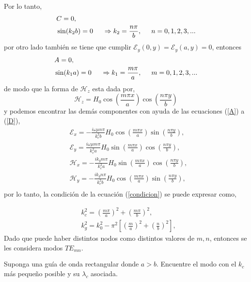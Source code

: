 \documentclass[11pt,fleqn]{book} %
\begin{document}
    Por lo tanto,
\begin{equation*}
    \begin{split}
    &C=0,\\
    &\sin(k_2b)=0 \hspace{0.5cm} \Rightarrow k_2=\frac{n\pi}{b},\hspace{0.5cm} n=0,1,2,3,...
    \end{split}
    \end{equation*}
    por otro lado tambi\'en se tiene que cumplir $\mathcal{E}_y(0,y)=\mathcal{E}_y(a,y)=0$, entonces
    \begin{equation*}
    \begin{split}
    &A=0,\\
    &\sin(k_1a)=0 \hspace{0.5cm} \Rightarrow k_1=\frac{m\pi}{a},\hspace{0.5cm} m=0,1,2,3,...
    \end{split}
    \end{equation*}
    de modo que la forma de $\mathcal{H}_z$ esta dada por,
    \begin{equation}
    \mathcal{H}_z=H_0 \cos\left( \frac{m\pi x}{a} \right) \cos \left( \frac{n\pi y}{b} \right)
    \end{equation}
    y podemos encontrar las dem\'as componentes con ayuda de las ecuaciones (\ref{A}) a (\ref{D}),
    \begin{equation*}
    \begin{split}
    & \mathcal{E}_x=-\frac{i\omega \mu n \pi }{k_c^2b}H_0 \cos\left( \frac{m\pi x}{a} \right) \sin \left( \frac{n\pi y}{b} \right),\\
    & \mathcal{E}_y=\frac{i\omega \mu m \pi}{k_c^2a}H_0 \sin\left( \frac{m\pi x}{a} \right) \cos \left( \frac{n\pi y}{b} \right),\\
    & \mathcal{H}_x=-\frac{i k_g m \pi}{k_c^2a}H_0 \sin\left( \frac{m\pi x}{a} \right) \cos \left( \frac{n\pi y}{b} \right),\\
    & \mathcal{H}_y=-\frac{i k_g n \pi}{k_c^2b}H_0 \cos\left( \frac{m\pi x}{a} \right) \sin \left( \frac{n\pi y}{b} \right),\\
        \end{split}
    \end{equation*}
   por lo tanto, la condici\'on de la ecuaci\'on (\ref{condicion}) se puede expresar como,

   \begin{equation}
   \begin{split}
   & k_c^2=\left(\frac{m\pi}{a}\right)^2+\left(\frac{m\pi}{b}\right)^2,\\
   & k_g^2=k_0^2-\pi^2\left[ \left(\frac{m}{a}\right)^2 +\left(\frac{n}{b}\right)^2\right],
  \end{split}
   \end{equation}
   Dado que puede haber distintos nodos como distintos valores de $m,n$, entonces se les considera modos $TE_{mn}$.

   \begin{example}
   Suponga una gu\'ia de onda rectangular donde $a>b$. Encuentre el modo con el $k_c$ m\'as pequeño posible y su $\lambda_c$ asociada.
   \end{example}
\end{document}
